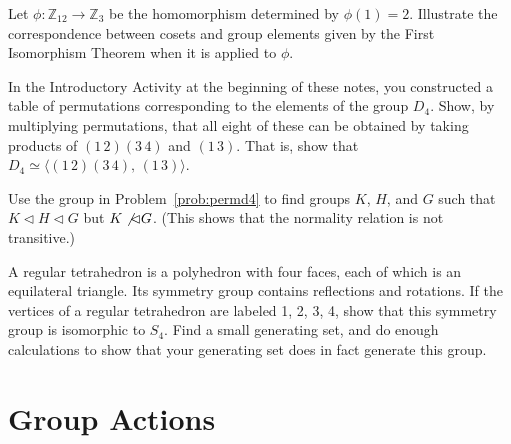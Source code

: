 \begin{problem}\label{prob:fitexample}
Let $\phi : \mathbb{Z}_{12} \longrightarrow \mathbb{Z}_{3}$ be the homomorphism determined by $\phi(1) = 2$.  Illustrate the correspondence between cosets and group elements given by the First Isomorphism Theorem when it is applied to $\phi$.
\begin{annotation}
\end{annotation}
\end{problem}

\begin{problem}\label{prob:permd4}
In the Introductory Activity at the beginning of these notes, you constructed a table of permutations corresponding to the elements of the group $D_4$. Show, by multiplying permutations, that all eight of these can be obtained by taking products of $(1\,2)(3\,4)$ and $(1\,3)$. That is, show that $D_4 \simeq \langle (1\,2)(3\,4),\,(1\,3)\rangle$.
\begin{annotation}
\end{annotation}
\end{problem}

\begin{problem}
Use the group in Problem~\ref{prob:permd4} to find groups $K$, $H$, and $G$ such that $K \lhd H \lhd G$ but $K \not\lhd G$. (This shows that the normality relation is not transitive.)
\end{problem}

\begin{problem}\label{prob:tetgp}
A regular tetrahedron is a polyhedron with four faces, each of which is an equilateral triangle. Its symmetry group contains reflections and rotations. If the vertices of a regular tetrahedron are labeled 1, 2, 3, 4, show that this symmetry group is isomorphic to $S_4$. Find a small generating set, and do enough calculations to show that your generating set does in fact generate this group.
\end{problem}

\section{Group Actions}

